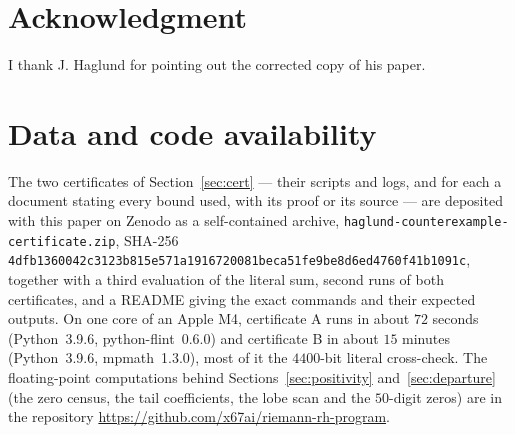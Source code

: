 \documentclass[11pt]{article}
\theoremstyle{plain}
\theoremstyle{definition}
\theoremstyle{remark}
\begin{document}
\section*{Acknowledgment}

I thank J. Haglund for pointing out the corrected copy \cite{HagW} of his paper.

\section*{Data and code availability}

The two certificates of Section~\ref{sec:cert} --- their scripts and logs, and
for each a document stating every bound used, with its proof or its source ---
are deposited with this paper on Zenodo as a self-contained archive,
\texttt{haglund-counterexample-certificate.zip}, SHA-256
\texttt{4dfb1360042c3123b815e571a1916720}\allowbreak\texttt{081beca51fe9be8d6ed4760f41b1091c}, together with a third evaluation
of the literal sum, second runs of both certificates, and a README giving the
exact commands and their expected outputs. On one core of an Apple M4,
certificate A runs in about $72$ seconds (Python~3.9.6, python-flint~0.6.0) and
certificate B in about $15$ minutes (Python~3.9.6, mpmath~1.3.0), most of it
the $4400$-bit literal cross-check. The floating-point computations behind
Sections~\ref{sec:positivity} and~\ref{sec:departure} (the zero census, the tail
coefficients, the lobe scan and the $50$-digit zeros) are in the repository
\url{https://github.com/x67ai/riemann-rh-program}.
\end{document}

